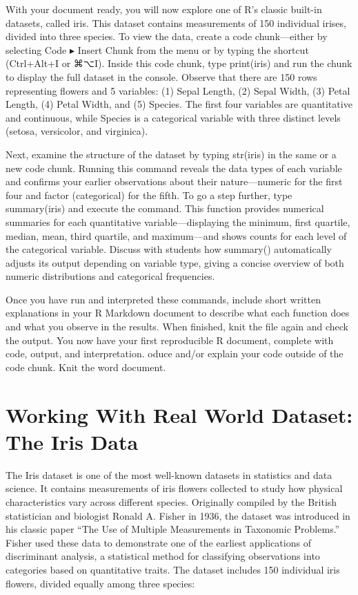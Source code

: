 \documentclass[
  letterpaper,
  DIV=11,
  numbers=noendperiod]{scrreprt}
\begin{document}
With your document ready, you will now explore one of R's classic
built-in datasets, called iris. This dataset contains measurements of
150 individual irises, divided into three species. To view the data,
create a code chunk---either by selecting Code ▸ Insert Chunk from the
menu or by typing the shortcut (Ctrl+Alt+I or ⌘⌥I). Inside this code
chunk, type print(iris) and run the chunk to display the full dataset in
the console. Observe that there are 150 rows representing flowers and 5
variables: (1) Sepal Length, (2) Sepal Width, (3) Petal Length, (4)
Petal Width, and (5) Species. The first four variables are quantitative
and continuous, while Species is a categorical variable with three
distinct levels (setosa, versicolor, and virginica).

Next, examine the structure of the dataset by typing str(iris) in the
same or a new code chunk. Running this command reveals the data types of
each variable and confirms your earlier observations about their
nature---numeric for the first four and factor (categorical) for the
fifth. To go a step further, type summary(iris) and execute the command.
This function provides numerical summaries for each quantitative
variable---displaying the minimum, first quartile, median, mean, third
quartile, and maximum---and shows counts for each level of the
categorical variable. Discuss with students how summary() automatically
adjusts its output depending on variable type, giving a concise overview
of both numeric distributions and categorical frequencies.

Once you have run and interpreted these commands, include short written
explanations in your R Markdown document to describe what each function
does and what you observe in the results. When finished, knit the file
again and check the output. You now have your first reproducible R
document, complete with code, output, and interpretation. oduce and/or
explain your code outside of the code chunk. Knit the word document.

\section{Working With Real World Dataset: The Iris
Data}\label{working-with-real-world-dataset-the-iris-data}

The Iris dataset is one of the most well-known datasets in statistics
and data science. It contains measurements of iris flowers collected to
study how physical characteristics vary across different species.
Originally compiled by the British statistician and biologist Ronald A.
Fisher in 1936, the dataset was introduced in his classic paper ``The
Use of Multiple Measurements in Taxonomic Problems.'' Fisher used these
data to demonstrate one of the earliest applications of discriminant
analysis, a statistical method for classifying observations into
categories based on quantitative traits. The dataset includes 150
individual iris flowers, divided equally among three species:
\end{document}

